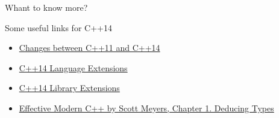 \documentclass{beamer}
\begin{document}
\begin{frame}{Whant to know more?}

Some useful links for C++14
\vfill
\begin{itemize}
\item \href{https://isocpp.org/files/papers/p1319r0.html}{Changes between C++11 and C++14}
\item \href{https://isocpp.org/wiki/faq/cpp14-language}{C++14 Language Extensions}
\item \href{https://isocpp.org/wiki/faq/cpp14-library}{C++14 Library Extensions}
\item \href{https://www.oreilly.com/library/view/effective-modern-c/9781491908419/ch01.html}{Effective Modern C++ by Scott Meyers, Chapter 1. Deducing Types}
\end{itemize}
\end{frame}
\end{document}
